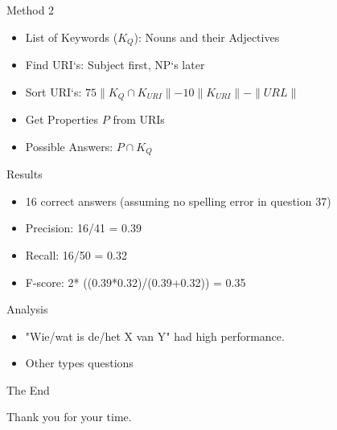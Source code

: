   \begin{frame}{Method 2}
    \begin{itemize}
      \item List of Keywords ($K_Q$): Nouns and their Adjectives 
      \item Find URI`s: Subject first, NP`s later
      \item Sort URI`s: $75\parallel K_Q \cap K_{URI} \parallel - 10\parallel K_{URI}\parallel - \parallel URL \parallel$
      \item Get Properties $P$ from URIs
      \item Possible Answers: $P \cap K_Q$
    \end{itemize}
  \end{frame}
  
  \begin{frame}{Results}
    \begin{itemize}
      \item 16 correct answers (assuming no spelling error in question 37)
      \item Precision: 16/41 = 0.39
      \item Recall: 16/50 = 0.32
      \item F-score: 2* ((0.39*0.32)/(0.39+0.32)) = 0.35
    \end{itemize}
  \end{frame}
  
  \begin{frame}{Analysis}
    \begin{itemize}
      \item "Wie/wat is de/het X van Y" had high performance.
      \item Other types questions
    \end{itemize}
  \end{frame}

  \begin{frame}{The End}
    \begin{center}
      Thank you for your time.
    \end{center}
  \end{frame}


